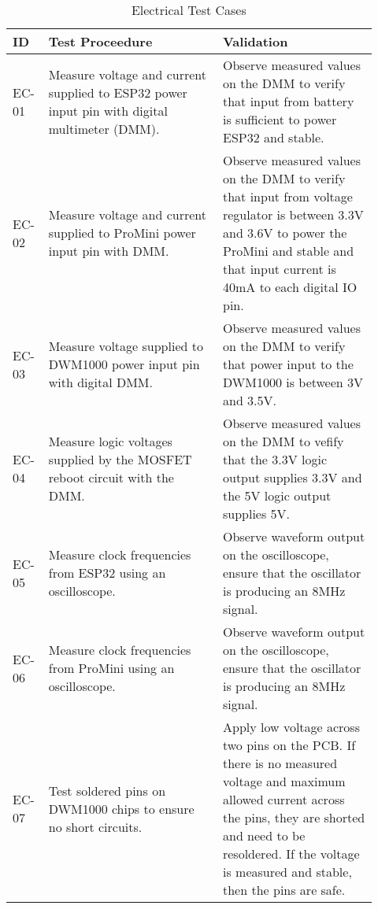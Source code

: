 \bigskip
\bgroup
\def\arraystretch{1.25}
\begin{table}[h!]
    \centering
    \begin{tabular}{|p{0.07\linewidth}|p{0.45\linewidth}|p{0.40\linewidth}|} 
    \hline
    ID & Test Proceedure & Validation\\ 

    \hline
    EC-01
    & Measure voltage and current supplied to ESP32 power input pin with digital multimeter (DMM).
    & Observe measured values on the DMM to verify that input from battery is sufficient to power ESP32 and stable. \\ 

    \hline
    EC-02
    & Measure voltage and current supplied to ProMini power input pin with DMM.
    & Observe measured values on the DMM to verify that input from voltage regulator is between 3.3V and 3.6V to power the ProMini and   stable and that input current is 40mA to each digital IO pin. \\

    \hline
    EC-03
    & Measure voltage supplied to DWM1000 power input pin with digital DMM.
    & Observe measured values on the DMM to verify that power input to the DWM1000 is between 3V and 3.5V. \\

    \hline
    EC-04
    & Measure logic voltages supplied by the MOSFET reboot circuit with the DMM.
    & Observe measured values on the DMM to vefify that the 3.3V logic output supplies 3.3V and the 5V logic output supplies 5V. \\

    \hline
    EC-05
    & Measure clock frequencies from ESP32 using an oscilloscope.
    & Observe waveform output on the oscilloscope, ensure that the oscillator is producing an 8MHz signal. \\

    \hline
    EC-06
    & Measure clock frequencies from ProMini using an oscilloscope.
    & Observe waveform output on the oscilloscope, ensure that the oscillator is producing an 8MHz signal. \\

    \hline
    EC-07
    & Test soldered pins on DWM1000 chips to ensure no short circuits.
    & Apply low voltage across two pins on the PCB. If there is no measured voltage and maximum allowed current across the pins, they are shorted and need to be resoldered. If the voltage is measured and stable, then the pins are safe. \\

    \hline
    \end{tabular}
    \caption{Electrical Test Cases}
\end{table}
%